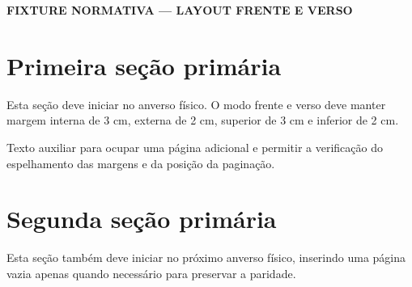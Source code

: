 \documentclass{abntexto-ufc}
\begin{document}
\pretextual
\begin{center}
  \textbf{FIXTURE NORMATIVA --- LAYOUT FRENTE E VERSO}
\end{center}
\newpage

\textual

\section{Primeira seção primária}
Esta seção deve iniciar no anverso físico. O modo frente e verso deve manter margem interna de 3 cm, externa de 2 cm, superior de 3 cm e inferior de 2 cm.

\newpage
Texto auxiliar para ocupar uma página adicional e permitir a verificação do espelhamento das margens e da posição da paginação.

\section{Segunda seção primária}
Esta seção também deve iniciar no próximo anverso físico, inserindo uma página vazia apenas quando necessário para preservar a paridade.
\end{document}
